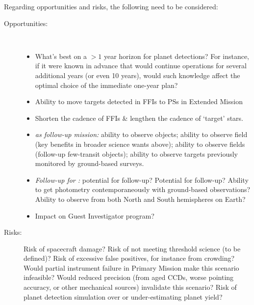 Regarding opportunities and risks, the following need to be considered:
\begin{description}
	\item[Opportunities:]\ 
	\begin{itemize}
	\item What's best on a $>1$ year horizon for planet detections? For instance, if it were known in advance
	that \tess would continue operations for several additional years (or even 10
	years), would such knowledge affect the optimal choice of the immediate
	one-year plan?
		\item Ability to move targets detected in FFIs to PSs in Extended Mission
		\item Shorten the cadence of FFIs \& lengthen the cadence of `target' stars.
		\item \textit{\tess as follow-up mission:} ability to
                  observe \corot objects; ability to observe \kepler
                  field (key benefits in broader science wants above);
                  ability to observe \ktwo fields (follow-up \ktwo
                  few-transit objects); ability to observe targets
                  previously monitored by ground-based surveys.
		\item \textit{Follow-up for \tess\!:} 
		potential for \jwst follow-up? 
		Potential for \cheops follow-up? 
		Ability to get \tess photometry contemporaneously with ground-based observations?
		Ability to observe from both North and South hemispheres on Earth?
		\item Impact on Guest Investigator program?
	\end{itemize}
	
	\item[Risks:] 
	Risk of spacecraft damage? 
	Risk of not meeting threshold science (to be defined)? 
	Risk of excessive false positives, for instance from crowding? 
	Would partial instrument failure in Primary Mission make this scenario infeasible? 
	Would reduced precision (from aged CCDs, worse pointing accuracy, or other mechanical sources) invalidate this scenario? 
	Risk of planet detection simulation over or under-estimating planet yield?
\end{description}

